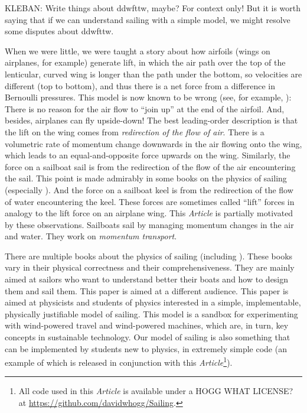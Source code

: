 \documentclass[letterpaper]{article}
\newcommand{\documentname}{\textsl{Article}}
\begin{document}
KLEBAN: Write things about ddwfttw, maybe? For context only! But it is worth saying that if we can understand sailing with a simple model, we might resolve some disputes about ddwfttw.

When we were little, we were taught a story about how airfoils (wings on airplanes, for example) generate lift, in which the air path over the top of the lenticular, curved wing is longer than the path under the bottom, so velocities are different (top to bottom), and thus there is a net force from a difference in Bernoulli pressures.
This model is now known to be wrong (see, for example, \cite{lift}):
There is no reason for the air flow to ``join up'' at the end of the airfoil.
And, besides, airplanes can fly upside-down!
The best leading-order description is that the lift on the wing comes from \emph{redirection of the flow of air}.
There is a volumetric rate of momentum change downwards in the air flowing onto the wing, which leads to an equal-and-opposite force upwards on the wing.
Similarly, the force on a sailboat sail is from the redirection of the flow of the air encountering the sail.
This point is made admirably in some books on the physics of sailing (especially \cite{sails}).
And the force on a sailboat keel is from the redirection of the flow of water encountering the keel.
These forces are sometimes called ``lift'' forces in analogy to the lift force on an airplane wing.
This \documentname{} is partially motivated by these observations.
Sailboats sail by managing momentum changes in the air and water.
They work on \emph{momentum transport}.

There are multiple books about the physics of sailing (including \cite{symmetry, explained, sails}).
These books vary in their physical correctness and their comprehensiveness.
They are mainly aimed at sailors who want to understand better their boats and how to design them and sail them.
This paper is aimed at a different audience.
This paper is aimed at physicists and students of physics interested in a simple, implementable, physically justifiable model of sailing.
This model is a sandbox for experimenting with wind-powered travel and wind-powered machines, which are, in turn, key concepts in sustainable technology.
Our model of sailing is also something that can be implemented by students new to physics, in extremely simple code (an example of which is released in conjunction with this \documentname\footnote{All code used in this \documentname{} is available under a HOGG WHAT LICENSE? at \url{https://github.com/davidwhogg/Sailing}.}).
\end{document}
